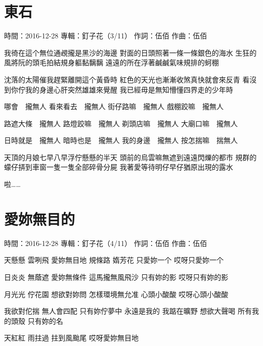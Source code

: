 \documentclass[UTF8,a4paper,oneside,twocolumn,12pt]{ctexbook}
\newcommand{\infopair}[2]{\textbullet #1：#2}
\newcommand{\zc}[1][伍佰]{\infopair{作詞}{#1}}
\newcommand{\zq}[1][伍佰]{\infopair{作曲}{#1}}
\newcommand{\zj}[1]{\infopair{專輯}{#1}}
\newcommand{\sj}[1]{\infopair{時間}{#1}}
\newenvironment{info}{\begin{flushleft}\kaishu
	}
	{\end{flushleft}\normalsize\yahei\par}
\newenvironment{lyric}{
	}
{}
\begin{document}
\section{東石}
\begin{info}
	\sj{2016-12-28}
	\zj{釘子花（3/11）}
	\zc
	\zq
\end{info}
\begin{lyric}
	我徛在這个無位通覕攏是黑沙的海邊
	對面的日頭照著一條一條銀色的海水
	生狂的風將阮的頭毛拍結規身軀黏黐黐
	遠遠的所在浮著鹹鹹氣味規排的蚵棚

	沈落的太陽催我趕緊離開這个黃昏時
	紅色的天光也漸漸收煞真快就會來反青
	看沒到你佇我的身邊心肝突然雄雄來覺醒
	我已經毋是無知懵懂四界走的少年時

	哪會　攏無人
	看來看去　攏無人
	街仔路嘛　攏無人
	戲棚跤嘛　攏無人

	路遮大條　攏無人
	路燈跤嘛　攏無人
	剃頭店嘛　攏無人
	大廟口嘛　攏無人

	日時就是　攏無人
	暗時也是　攏無人
	我的身邊　攏無人
	按怎揣嘛　揣無人

	天頂的月娘七早八早浮佇懸懸的半天
	頭前的烏雲嘛無遮到遠遠閃爍的都市
	規群的蠓仔挵到車窗一隻一隻全部碎骨分屍
	我著愛等待明仔早仔猶原出現的露水

	啦……
\end{lyric}

\section{愛妳無目的}
\begin{info}
	\sj{2016-12-28}
	\zj{釘子花（4/11）}
	\zc
	\zq
\end{info}
\begin{lyric}
	天懸懸 雲咧飛
	愛妳無目地
	規條路 媠芳花
	只愛妳一个 哎呀只愛妳一个

	日炎炎 無蔭遮
	愛妳無條件
	這馬攏無風飛沙
	只有妳的影 哎呀只有妳的影

	月光光 佇花園
	想欲對妳問
	怎樣環境無允准
	心頭小酸酸 哎呀心頭小酸酸

	我欲對佗揣 無人會四配
	只有妳佇夢中 永遠是我的
	我踮在曠野 想欲大聲喝
	所有我的頭殼 只有妳的名

	天紅紅 雨拄過
	拄到風颱尾 哎呀愛妳無目地
\end{lyric}
\end{document}
